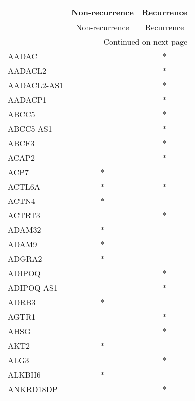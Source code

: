\begin{longtable}{lcc}
\toprule
{} & Non-recurrence & Recurrence \\
\midrule
\endfirsthead

\toprule
{} & Non-recurrence & Recurrence \\
\midrule
\endhead
\midrule
\multicolumn{3}{r}{{Continued on next page}} \\
\midrule
\endfoot

\bottomrule
\endlastfoot
AADAC            &                &          * \\
AADACL2          &                &          * \\
AADACL2-AS1      &                &          * \\
AADACP1          &                &          * \\
ABCC5            &                &          * \\
ABCC5-AS1        &                &          * \\
ABCF3            &                &          * \\
ACAP2            &                &          * \\
ACP7             &              * &            \\
ACTL6A           &              * &          * \\
ACTN4            &              * &            \\
ACTRT3           &                &          * \\
ADAM32           &              * &            \\
ADAM9            &              * &            \\
ADGRA2           &              * &            \\
ADIPOQ           &                &          * \\
ADIPOQ-AS1       &                &          * \\
ADRB3            &              * &            \\
AGTR1            &                &          * \\
AHSG             &                &          * \\
AKT2             &              * &            \\
ALG3             &                &          * \\
ALKBH6           &              * &            \\
ANKRD18DP        &                &          * \\

\end{longtable}
